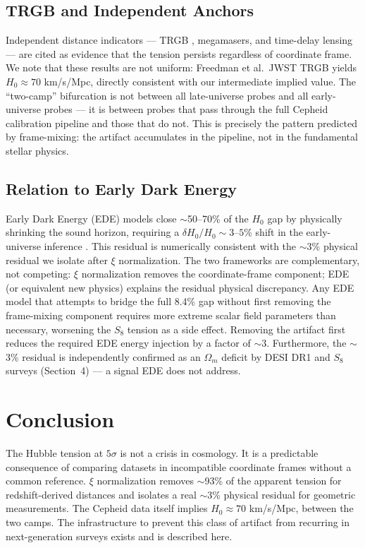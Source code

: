 \documentclass[12pt,a4paper]{article}
\begin{document}
\subsection{TRGB and Independent Anchors}

Independent distance indicators --- TRGB \citep{freedman2024}, megamasers,
and time-delay lensing --- are cited as evidence that the tension persists
regardless of coordinate frame. We note that these results are not uniform:
Freedman et al.\ JWST TRGB yields $H_0 \approx 70$ km/s/Mpc, directly
consistent with our intermediate implied value. The ``two-camp''
bifurcation is not between all late-universe probes and all early-universe
probes --- it is between probes that pass through the full Cepheid
calibration pipeline and those that do not. This is precisely the
pattern predicted by frame-mixing: the artifact accumulates in the
pipeline, not in the fundamental stellar physics.

\subsection{Relation to Early Dark Energy}

Early Dark Energy (EDE) models close $\sim$50--70\% of the $H_0$ gap
by physically shrinking the sound horizon, requiring a
$\delta H_0 / H_0 \sim 3$--$5$\% shift in the early-universe
inference \citep{poulin2019}. This residual is numerically consistent with
the $\sim$3\% physical residual we isolate after $\xi$ normalization.
The two frameworks are complementary, not competing: $\xi$ normalization
removes the coordinate-frame component; EDE (or equivalent new physics)
explains the residual physical discrepancy. Any EDE model that attempts
to bridge the full 8.4\% gap without first removing the frame-mixing
component requires more extreme scalar field parameters than necessary,
worsening the $S_8$ tension as a side effect. Removing the artifact first
reduces the required EDE energy injection by a factor of $\sim$3.
Furthermore, the $\sim$3\% residual is independently confirmed as an
$\Omega_m$ deficit by DESI DR1 and $S_8$ surveys (Section~4) --- a signal
EDE does not address.

\section{Conclusion}

The Hubble tension at $5\sigma$ is not a crisis in cosmology. It is a
predictable consequence of comparing datasets in incompatible coordinate frames
without a common reference. $\xi$ normalization removes $\sim$93\% of the
apparent tension for redshift-derived distances and isolates a real $\sim$3\%
physical residual for geometric measurements. The Cepheid data itself implies
$H_0 \approx 70$ km/s/Mpc, between the two camps. The infrastructure to
prevent this class of artifact from recurring in next-generation surveys exists
and is described here.
\end{document}
